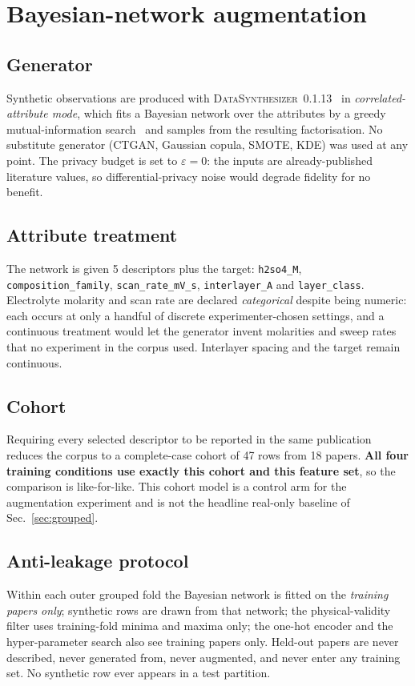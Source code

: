 \section{Bayesian-network augmentation}\label{sec:bnmethod}

\subsection{Generator}
Synthetic observations are produced with
\textsc{DataSynthesizer}~0.1.13~\cite{datasynthesizer2017} in
\emph{correlated-attribute mode}, which fits a Bayesian network over the attributes by a
greedy mutual-information search~\cite{privbayes2017} and samples from the resulting
factorisation. No substitute
generator (CTGAN, Gaussian copula, SMOTE, KDE) was used at any point. The privacy budget is
set to $\varepsilon = 0$: the inputs are already-published literature values, so
differential-privacy noise would degrade fidelity for no benefit.

\subsection{Attribute treatment}
The network is given 5 descriptors plus the target:
\texttt{h2so4\_M}, \texttt{composition\_family}, \texttt{scan\_rate\_mV\_s}, \texttt{interlayer\_A} and \texttt{layer\_class}.
Electrolyte molarity and scan rate are declared \emph{categorical} despite being numeric:
each occurs at only a handful of discrete experimenter-chosen settings, and a continuous
treatment would let the generator invent molarities and sweep rates that no experiment in
the corpus used. Interlayer spacing and the target remain continuous.

\subsection{Cohort}
Requiring every selected descriptor to be reported in the same publication reduces the
corpus to a complete-case cohort of 47 rows from
18 papers. \textbf{All four training conditions use exactly this
cohort and this feature set}, so the comparison is like-for-like. This cohort model is a
control arm for the augmentation experiment and is not the headline real-only baseline of
Sec.~\ref{sec:grouped}.

\subsection{Anti-leakage protocol}
Within each outer grouped fold the Bayesian network is fitted on the \emph{training papers
only}; synthetic rows are drawn from that network; the physical-validity filter uses
training-fold minima and maxima only; the one-hot encoder and the hyper-parameter search
also see training papers only. Held-out papers are never described, never generated from,
never augmented, and never enter any training set. No synthetic row ever appears in a test
partition.

